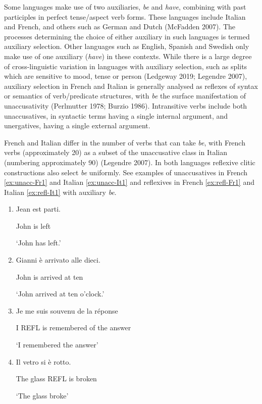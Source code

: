 \documentclass[
  12pt,
]{article}
\begin{document}
Some languages make use of two auxiliaries, \emph{be} and \emph{have}, combining with past participles in perfect tense/aspect verb forms. These languages include Italian and French, and others such as German and Dutch (McFadden 2007). The processes determining the choice of either auxiliary in such languages is termed auxiliary selection. Other languages such as English, Spanish and Swedish only make use of one auxiliary (\emph{have}) in these contexts. While there is a large degree of cross-linguistic variation in languages with auxiliary selection, such as splits which are sensitive to mood, tense or person (Ledgeway 2019; Legendre 2007), auxiliary selection in French and Italian is generally analysed as reflexes of syntax or semantics of verb/predicate structures, with \emph{be} the surface manifestation of unaccusativity (Perlmutter 1978; Burzio 1986). Intransitive verbs include both unaccusatives, in syntactic terms having a single internal argument, and unergatives, having a single external argument.

French and Italian differ in the number of verbs that can take \emph{be}, with French verbs (approximately 20) as a subset of the unaccusative class in Italian (numbering approximately 90) (Legendre 2007). In both languages reflexive clitic constructions also select \emph{be} uniformly. See examples of unaccusatives in French \ref{ex:unacc-Fr1} and Italian \ref{ex:unacc-It1} and reflexives in French \ref{ex:refl-Fr1} and Italian \ref{ex:refl-It1} with auxiliary \emph{be}.

\begin{enumerate}[start=1,label={(\arabic*)}]
\item Jean est parti.     \label{ex:unacc-Fr1}

      John is left
      
     `John has left.'
\item Gianni è arrivato alle dieci. \label{ex:unacc-It1}

      John is arrived at ten
      
     `John arrived at ten o’clock.'
\item Je me suis souvenu de la réponse \label{ex:refl-Fr1}

      I REFL is remembered of the answer
      
     `I remembered the answer'
\item Il vetro si è rotto.  \label{ex:refl-It1}

      The glass REFL is broken
      
     `The glass broke'
\end{enumerate}
\end{document}
